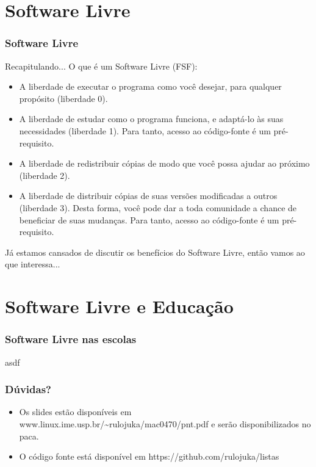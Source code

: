 \documentclass[serif,mathserif]{beamer}
\begin{document}
\section{Software Livre}
\begin{frame}
  \frametitle{Software Livre}
  Recapitulando... O que é um Software Livre (FSF):\pause
  \begin{itemize}[<+->]
    \item A liberdade de executar o programa como você desejar, para qualquer propósito (liberdade 0).
    \item A liberdade de estudar como o programa funciona, e adaptá-lo às suas necessidades (liberdade 1). Para tanto, acesso ao código-fonte é um pré-requisito.
    \item A liberdade de redistribuir cópias de modo que você possa ajudar ao próximo (liberdade 2).
    \item A liberdade de distribuir cópias de suas versões modificadas a outros (liberdade 3). Desta forma, você pode dar a toda comunidade a chance de beneficiar de suas mudanças. Para tanto, acesso ao código-fonte é um pré-requisito.
  \end{itemize}
\end{frame}
\begin{frame}
  Já estamos cansados de discutir os benefícios do Software Livre, então vamos ao que interessa...
\end{frame}

\section{Software Livre e Educação}
\begin{frame}
  \frametitle{Software Livre nas escolas}
  \pause
  asdf
\end{frame}

\begin{frame}
  \frametitle{Dúvidas?}
  \begin{itemize}
    \item Os slides estão disponíveis em www.linux.ime.usp.br/\textasciitilde rulojuka/mac0470/pnt.pdf e serão disponibilizados no paca.\\
    \item O código fonte está disponível em https://github.com/rulojuka/listas
  \end{itemize}
\end{frame}
\end{document}
